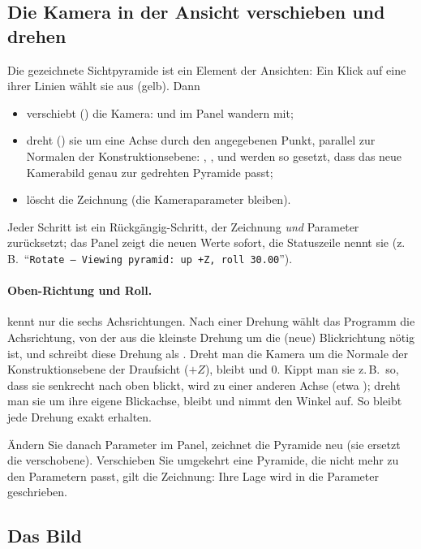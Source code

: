 \subsection{Die Kamera in der Ansicht verschieben und drehen}\label{sec:pt-kamera-bewegen}

Die gezeichnete Sichtpyramide ist ein Element der Ansichten: Ein Klick auf eine ihrer Linien
wählt sie aus (gelb). Dann
\begin{itemize}
  \item verschiebt  () die Kamera:  und  im Panel
    wandern mit;
  \item dreht  () sie um eine Achse durch den angegebenen Punkt, parallel
    zur Normalen der Konstruktionsebene: , ,  und 
    werden so gesetzt, dass das neue Kamerabild genau zur gedrehten Pyramide passt;
  \item löscht  die Zeichnung (die Kameraparameter bleiben).
\end{itemize}
Jeder Schritt ist ein Rückgängig-Schritt, der Zeichnung \emph{und} Parameter zurücksetzt; das
Panel zeigt die neuen Werte sofort, die Statuszeile nennt sie (z.\,B.\ \enquote{\texttt{Rotate – Viewing pyramid: up +Z, roll
30.00\textdegree}}).

\paragraph{Oben-Richtung und Roll.}  kennt nur die sechs Achsrichtungen. Nach einer
Drehung wählt das Programm die Achsrichtung, von der aus die kleinste Drehung um die (neue)
Blickrichtung nötig ist, und schreibt diese Drehung als . Dreht man die Kamera um die
Normale der Konstruktionsebene der Draufsicht ($+Z$), bleibt   und 
$0$. Kippt man sie z.\,B.\ so, dass sie senkrecht nach oben blickt, wird  zu einer
anderen Achse (etwa ); dreht man sie um ihre eigene Blickachse, bleibt  und
 nimmt den Winkel auf. So bleibt jede Drehung exakt erhalten.

Ändern Sie danach Parameter im Panel, zeichnet  die Pyramide neu (sie ersetzt
die verschobene). Verschieben Sie umgekehrt eine Pyramide, die nicht mehr zu den Parametern
passt, gilt die Zeichnung: Ihre Lage wird in die Parameter geschrieben.

\subsection{Das Bild}

